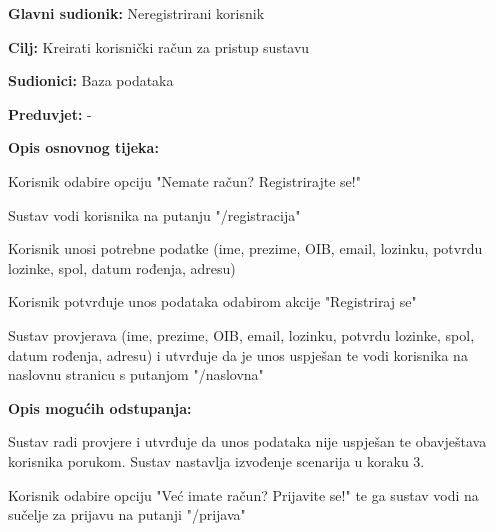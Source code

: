 					\noindent {}
					\begin{packed_item}
	
						\item \textbf{Glavni sudionik: } Neregistrirani korisnik
						\item  \textbf{Cilj:} Kreirati korisnički račun za pristup sustavu
						\item  \textbf{Sudionici:} Baza podataka
						\item  \textbf{Preduvjet:} -
						\item  \textbf{Opis osnovnog tijeka:}
						
						\item[] \begin{packed_enum}
	
							\item Korisnik odabire opciju "Nemate račun? Registrirajte se!"
							\item Sustav vodi korisnika na putanju "/registracija" 
							\item Korisnik unosi potrebne podatke (ime, prezime, OIB, email, lozinku, potvrdu lozinke, spol, datum rođenja, adresu)
							\item Korisnik potvrđuje unos podataka odabirom akcije "Registriraj se"
							\item Sustav provjerava (ime, prezime, OIB, email, lozinku, potvrdu lozinke, spol, datum rođenja, adresu) i utvrđuje da je unos uspješan te vodi korisnika na naslovnu stranicu s putanjom "/naslovna"
						\end{packed_enum}
						
						\item  \textbf{Opis mogućih odstupanja:}
						
						\item[] \begin{packed_item}
							
							\item[5.a] Sustav radi provjere i utvrđuje da unos podataka nije uspješan te obavještava korisnika porukom. Sustav nastavlja izvođenje scenarija u koraku 3. 
	
							\item[5.b] Korisnik odabire opciju "Već imate račun? Prijavite se!" te ga sustav vodi na sučelje za prijavu na putanji "/prijava"
						
						\end{packed_item}
								
					\end{packed_item}
					
